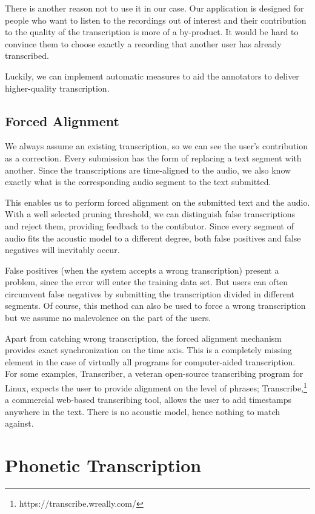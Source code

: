 \documentclass{itatnew}
\begin{document}
There is another reason not to use it in our case. Our application is
designed for people who want to listen to the recordings out of interest and
their contribution to the quality of the transcription is more of a by-product.
It would be hard to convince them to choose exactly a recording that another
user has already transcribed.

Luckily, we can implement automatic measures to aid the annotators to deliver
higher-quality transcription.

\subsection{Forced Alignment}

We always assume an existing transcription, so we can see the user's
contribution as a correction. Every submission has the form of replacing a text
segment with another. Since the transcriptions are time-aligned to the audio, we
also know exactly what is the corresponding audio segment to the text submitted.

This enables us to perform forced alignment on the submitted text and the audio.
With a well selected pruning threshold, we can distinguish false transcriptions
and reject them, providing feedback to the contibutor.
Since every segment of audio fits the acoustic model to a different degree, both
false positives and false negatives will inevitably occur.

False positives (when the system accepts a wrong transcription) present a
problem, since the error will enter the training data set. But users can often
circumvent false negatives by submitting the transcription divided in different
segments.  Of course, this method can also be used to force a wrong
transcription but we assume no malevolence on the part of the users.

Apart from catching wrong transcription, the forced alignment mechanism provides
exact synchronization on the time axis. This is a completely missing element in
the case of virtually all programs for computer-aided transcription. For some
examples, Transcriber, a veteran open-source transcribing program for Linux,
expects the user to provide alignment on the level of phrases;
Transcribe,\footnote{https://transcribe.wreally.com/} a commercial web-based
transcribing tool, allows the user to add timestamps anywhere in the text. There
is no acoustic model, hence nothing to match against.

\section{Phonetic Transcription}
\end{document}
